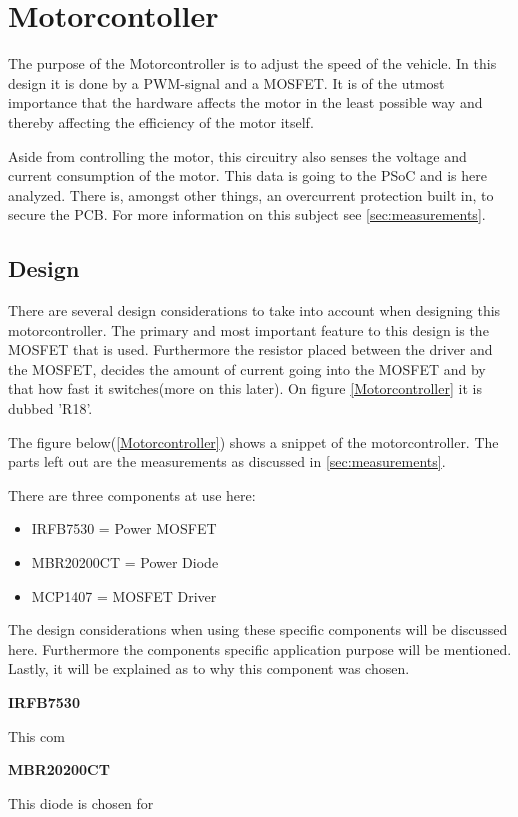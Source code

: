 \section{Motorcontoller}
The purpose of the Motorcontroller is to adjust the speed of the vehicle. In this design it is done by a PWM-signal and a MOSFET. It is of the utmost importance that the hardware affects the motor in the least possible way and thereby affecting the efficiency of the motor itself.

Aside from controlling the motor, this circuitry also senses the voltage and current consumption of the motor. This data is going to the PSoC and is here analyzed. There is, amongst other things, an overcurrent protection built in, to secure the PCB. For more information on this subject see \vref{sec:measurements}.

\subsection{Design}
There are several design considerations to take into account when designing this motorcontroller. The primary and most important feature to this design is the MOSFET that is used. Furthermore the resistor placed between the driver and the MOSFET, decides the amount of current going into the MOSFET and by that how fast it switches(more on this later). On figure \vref{Motorcontroller} it is dubbed 'R18'. 

The figure below(\vref{Motorcontroller}) shows a snippet of the motorcontroller. The parts left out are the measurements as discussed in \vref{sec:measurements}.

There are three components at use here:

\begin{itemize}
	\item{IRFB7530 = Power MOSFET}
	\item{MBR20200CT = Power Diode}
	\item{MCP1407 = MOSFET Driver}
\end{itemize}

The design considerations when using these specific components will be discussed here. Furthermore the components specific application purpose will be mentioned. Lastly, it will be explained as to why this component was chosen.  

\textbf{IRFB7530}

This com

\textbf{MBR20200CT}

This diode is chosen for

